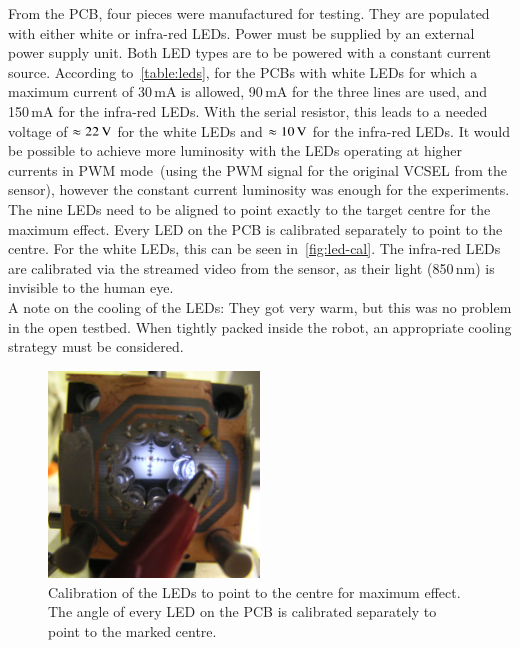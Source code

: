 \documentclass[12pt,a4paper]{article}
\begin{document}
From the PCB, four pieces were manufactured for testing.
They are populated with either white or infra-red LEDs.
Power must be supplied by an external power supply unit.
Both LED types are to be powered with a constant current source.
According to~\autoref{table:leds}, for the PCBs with white LEDs for which a maximum current of 30\,mA is allowed, 90\,mA for the three lines are used, and 150\,mA for the infra-red LEDs.
With the serial resistor, this leads to a needed voltage of $\approx\unit[22]{V}$ for the white LEDs and $\approx\unit[10]{V}$ for the infra-red LEDs.
It would be possible to achieve more luminosity with the LEDs operating at higher currents in PWM mode~(using the PWM signal for the original VCSEL from the sensor), however the constant current luminosity was enough for the experiments.\\
The nine LEDs need to be aligned to point exactly to the target centre for the maximum effect.
Every LED on the PCB is calibrated separately to point to the centre.
For the white LEDs, this can be seen in~\autoref{fig:led-cal}.
The infra-red LEDs are calibrated via the streamed video from the sensor, as their light (850\,nm) is invisible to the human eye.\\
A note on the cooling of the LEDs: They got very warm, but this was no problem in the open testbed.
When tightly packed inside the robot, an appropriate cooling strategy must be considered.

\begin{figure}[htbp]
\begin{center}
\includegraphics[width=0.5\textwidth]{figures/led-centre-cal.png}
\caption{\label{fig:led-cal}
Calibration of the LEDs to point to the centre for maximum effect.
The angle of every LED on the PCB is calibrated separately to point to the marked centre.
}
\end{center}
\end{figure}
\end{document}
